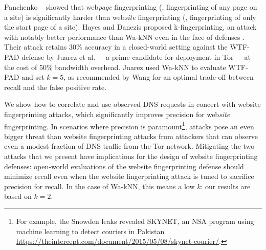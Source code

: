 Panchenko \ea~\cite{Panchenko2016a} showed that web\emph{page}
fingerprinting (\ie, fingerprinting of any page on a site) is
significantly harder than web\emph{site} fingerprinting (\ie,
fingerprinting of only the start page of a site).  Hayes and Danezis
proposed k-fingerprinting, an attack with notably better performance
than Wa-kNN even in the face of defenses
\cite{Hayes2016a}. Their attack retains 30\% accuracy in a
closed-world setting against the WTF-PAD defense by Juarez et
al.~\cite{Juarez2016a}---a prime candidate for
deployment in Tor~\cite{adapativepadding}---at the cost of 50\% bandwidth
overhead. Juarez \ea used Wa-kNN to evaluate WTF-PAD and set $k=5$, as
recommended by Wang \ea for an optimal trade-off between recall and the
false positive rate.

We show how to correlate and use observed DNS requests in
concert with website fingerprinting attacks,
which significantly
improves precision for web\emph{site} fingerprinting.
In scenarios where precision is paramount\footnote{For example, the
Snowden leaks revealed SKYNET, an NSA program
using machine learning to detect couriers in Pakistan
\url{https://theintercept.com/document/2015/05/08/skynet-courier/}.}, \name
attacks pose an even bigger threat than website fingerprinting attacks from
attackers that can observe even a modest fraction of DNS traffic from the Tor
network.
Mitigating the two \name attacks that we present have implications
for the design of website fingerprinting defenses:
open-world evaluations of the website fingerprinting
defense should minimize recall even when the website fingerprinting attack is
tuned to sacrifice precision for recall.  In the case of Wa-kNN, this means
a low $k$: our results are based on $k=2$.
